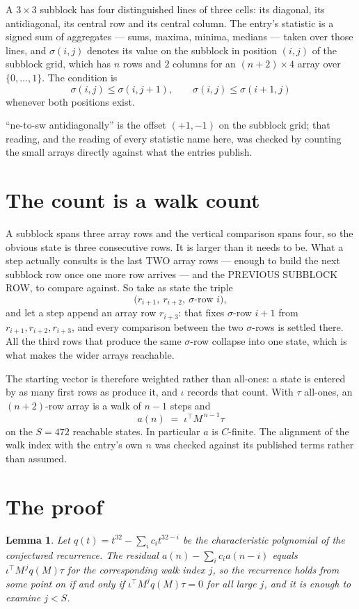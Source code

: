 \documentclass[11pt,a4paper]{article}
\theoremstyle{plain}
\newtheorem{lemma}[theorem]{Lemma}
\theoremstyle{definition}
\begin{document}
A $3\times3$ subblock has four distinguished lines of three cells: its diagonal, its
antidiagonal, its central row and its central column. The entry's statistic is a signed sum of
aggregates --- sums, maxima, minima, medians --- taken over those lines, and $\sigma(i,j)$
denotes its value on the subblock in position $(i,j)$ of the subblock grid, which has $n$ rows
and $2$ columns for an $(n+2)\times4$ array over $\{0,\dots,1\}$. The condition is
\[
\sigma(i,j)\le\sigma(i,j+1),\qquad \sigma(i,j)\le\sigma(i+1,j)
\]
whenever both positions exist.

``ne-to-sw antidiagonally'' is the offset $(+1,-1)$ on the subblock grid; that reading, and
the reading of every statistic name here, was checked by counting the small arrays directly
against what the entries publish.

\section{The count is a walk count}

A subblock spans three array rows and the vertical comparison spans four, so the obvious state
is three consecutive rows. It is larger than it needs to be. What a step actually consults is
the last TWO array rows --- enough to build the next subblock row once one more row arrives ---
and the PREVIOUS SUBBLOCK ROW, to compare against. So take as state the triple
\[
\bigl(r_{i+1},\ r_{i+2},\ \sigma\text{-row }i\bigr),
\]
and let a step append an array row $r_{i+3}$: that fixes $\sigma$-row $i+1$ from
$r_{i+1},r_{i+2},r_{i+3}$, and every comparison between the two $\sigma$-rows is settled
there. All the third rows that produce the same $\sigma$-row collapse into one state, which is
what makes the wider arrays reachable.

The starting vector is therefore weighted rather than all-ones: a state is entered by as many
first rows as produce it, and $\iota$ records that count. With $\tau$ all-ones, an
$(n+2)$-row array is a walk of $n-1$ steps and
\[
a(n)\;=\;\iota^{\!\top}M^{\,n-1}\tau
\]
on the $S=472$ reachable states. In particular $a$ is $C$-finite. The alignment of the walk
index with the entry's own $n$ was checked against its published terms rather than assumed.

\section{The proof}

\begin{lemma}\label{lem:crit}
Let $q(t)=t^{32}-\sum_i c_it^{32-i}$ be the characteristic polynomial of the
conjectured recurrence. The residual $a(n)-\sum_ic_ia(n-i)$ equals
$\iota^{\!\top}M^{\,j}q(M)\tau$ for the corresponding walk index $j$, so the recurrence
holds from some point on if and only if $\iota^{\!\top}M^{j}q(M)\tau=0$ for all large $j$,
and it is enough to examine $j<S$.
\end{lemma}
\end{document}
